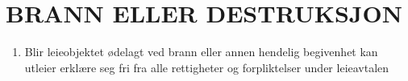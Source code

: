 \section{BRANN ELLER DESTRUKSJON}


    \begin{enumerate}

        \item Blir leieobjektet ødelagt ved brann eller annen hendelig begivenhet kan utleier erklære seg fri fra alle
        rettigheter og forpliktelser under leieavtalen

    \end{enumerate}
